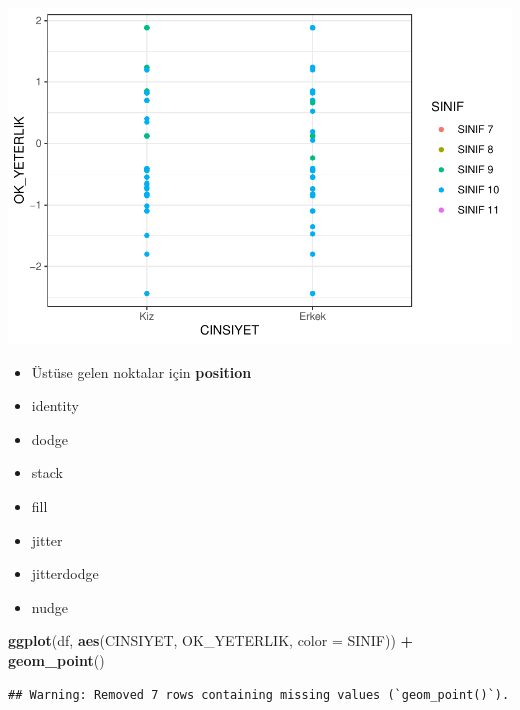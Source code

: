 \documentclass[
  oneside]{book}
\newenvironment{Shaded}{\begin{snugshade}}{\end{snugshade}}
\newcommand{\AttributeTok}[1]{\textcolor[rgb]{0.13,0.29,0.53}{#1}}
\newcommand{\FunctionTok}[1]{\textcolor[rgb]{0.13,0.29,0.53}{\textbf{#1}}}
\newcommand{\NormalTok}[1]{#1}
\newcommand{\SpecialCharTok}[1]{\textcolor[rgb]{0.81,0.36,0.00}{\textbf{#1}}}
\begin{document}
\begin{center}\includegraphics[width=1\linewidth]{15-betimleyici-istatistik_files/figure-latex/unnamed-chunk-42-1} \end{center}

\begin{itemize}
\item
  Üstüse gelen noktalar için \textbf{position}
\item
  identity
\item
  dodge
\item
  stack
\item
  fill
\item
  jitter
\item
  jitterdodge
\item
  nudge
\end{itemize}

\begin{Shaded}
\begin{Highlighting}[]
\FunctionTok{ggplot}\NormalTok{(df, }\FunctionTok{aes}\NormalTok{(CINSIYET, OK\_YETERLIK, }\AttributeTok{color =}\NormalTok{ SINIF)) }\SpecialCharTok{+}
  \FunctionTok{geom\_point}\NormalTok{()}
\end{Highlighting}
\end{Shaded}

\begin{verbatim}
## Warning: Removed 7 rows containing missing values (`geom_point()`).
\end{verbatim}
\end{document}
